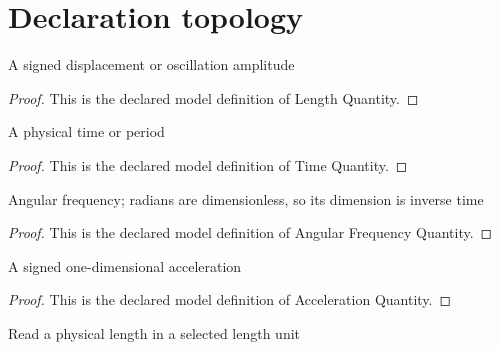 \section{Declaration topology}
\begin{definition}
  \label{def:physics:phyx-mini-0230:phyxminiproblems-problemphyxmini0230-lengthquantity}
  A signed displacement or oscillation amplitude
\end{definition}
\begin{proof}
  This is the declared model definition of Length Quantity.
\end{proof}
\begin{definition}
  \label{def:physics:phyx-mini-0230:phyxminiproblems-problemphyxmini0230-timequantity}
  A physical time or period
\end{definition}
\begin{proof}
  This is the declared model definition of Time Quantity.
\end{proof}
\begin{definition}
  \label{def:physics:phyx-mini-0230:phyxminiproblems-problemphyxmini0230-angularfrequencyquantity}
  Angular frequency; radians are dimensionless, so its dimension is inverse time
\end{definition}
\begin{proof}
  This is the declared model definition of Angular Frequency Quantity.
\end{proof}
\begin{definition}
  \label{def:physics:phyx-mini-0230:phyxminiproblems-problemphyxmini0230-accelerationquantity}
  A signed one-dimensional acceleration
\end{definition}
\begin{proof}
  This is the declared model definition of Acceleration Quantity.
\end{proof}
\begin{definition}
  \label{def:physics:phyx-mini-0230:phyxminiproblems-problemphyxmini0230-lengthreadout}
  Read a physical length in a selected length unit
\end{definition}
